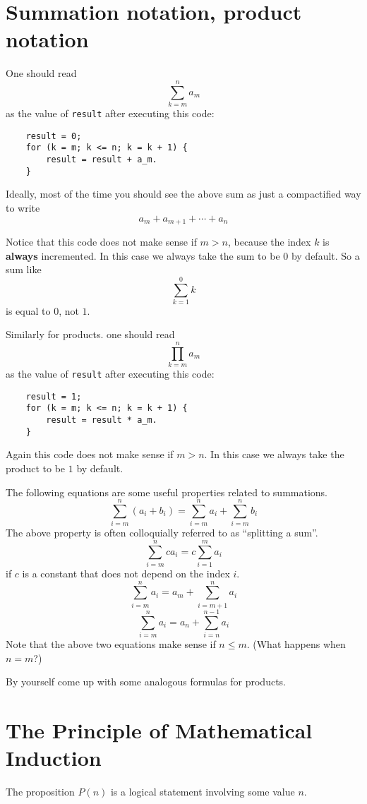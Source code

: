 \section{Summation notation, product notation}

One should read 
\[\sum_{k = m}^na_m\] as the value of \verb|result| after executing this code:
\begin{verbatim}
    result = 0;
    for (k = m; k <= n; k = k + 1) {
        result = result + a_m.
    }
\end{verbatim}

Ideally, most of the time you should see the above sum as just a compactified way to write 
\[a_m + a_{m + 1} + \cdots + a_n\]

Notice that this code does not make sense if $m > n$, because the index $k$ is \textbf{always} incremented. In this case we always take the sum to be $0$ by default. So a sum like
\[\sum_{k = 1}^0k\] is equal to $0$, not $1$.

Similarly for products. one should read \[\prod_{k = m}^na_m\] as the value of \verb|result| after executing this code:

\begin{verbatim}
    result = 1;
    for (k = m; k <= n; k = k + 1) {
        result = result * a_m.
    }
\end{verbatim}

Again this code does not make sense if $m > n$. In this case we always take the product to be $1$ by default.

The following equations are some useful properties related to summations.
\[\sum_{i = m}^n(a_i + b_i) = \sum_{i = m}^na_i + \sum_{i = m}^nb_i\]
The above property is often colloquially referred to as ``splitting a sum''.
\[\sum_{i = m}^nca_i = c\sum_{i = 1}^ma_i\] if $c$ is a constant that does not depend on the index $i$.
\[\sum_{i = m}^na_i = a_m + \sum_{i = m + 1}^na_i\]
\[\sum_{i = m}^na_i = a_n + \sum_{i = n}^{n-1}a_i\]
Note that the above two equations make sense if $n \leq m$. (What happens when $n = m$?)

By yourself come up with some analogous formulas for products.

\section{The Principle of Mathematical Induction}

\begin{definition}
    The proposition $P(n)$ is a logical statement involving some value $n$.
\end{definition}

